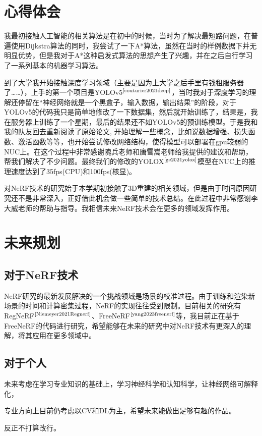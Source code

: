 \documentclass[UTF8,titlepage]{article}
\newcommand{\upcite}[1]{$^{\mbox{\scriptsize \cite{#1}}}$}
\numberwithin{figure}{section}
\begin{document}
\section{心得体会}

我最初接触人工智能的相关算法是在初中的时候，当时为了解决最短路问题，在普遍使用Dijkstra算法的同时，我尝试了一下A*算法，虽然在当时的样例数据下并无明显优势，但是我对于A*这种启发式算法的思想产生了兴趣，并在之后自行学习了一系列基本的机器学习算法。

到了大学我开始接触深度学习领域（主要是因为上大学之后手里有钱租服务器了……），上手的第一个项目是YOLOv5\upcite{couturier2021deep}，当时我对于深度学习的理解还停留在“神经网络就是一个黑盒子，输入数据，输出结果”的阶段，对于YOLOv5的代码我只是简单地修改了一下数据集，然后就开始训练了，结果是，我在服务器上训练了一个星期，最后的结果还不如YOLOv5的预训练模型。于是我和我的队友回去重新阅读了原始论文\cite{couturier2021deep}, 开始理解一些概念，比如说数据增强、损失函数、激活函数等等，也开始尝试修改网络结构，使得模型可以部署在gpu较弱的NUC上。在这个过程中非常感谢隗兵老师和唐雪嵩老师给我提供的建议和帮助，帮我们解决了不少问题。最终我们的修改的YOLOX\upcite{ge2021yolox}模型在NUC上的推理速度达到了35fps(CPU)和100fps(核显)。

对NeRF技术的研究始于本学期初接触了3D重建的相关领域，但是由于时间原因研究还不是非常深入，正好借此机会做一些简单的技术总结。在此过程中非常感谢李大威老师的帮助与指导。我相信未来NeRF技术会在更多的领域发挥作用。

\section{未来规划}
\subsection{对于NeRF技术}

NeRF研究的最新发展解决的一个挑战领域是场景的校准过程。由于训练和渲染新场景的时间和计算密集过程，NeRF的实现往往受到限制。目前相关的研究有RegNeRF\upcite{Niemeyer2021Regnerf}、FreeNeRF\upcite{yang2023freenerf}等，我目前正在基于FreeNeRF的代码进行研究，希望能够在未来的研究中对NeRF技术有更深入的理解，将其应用在更多领域中。

\subsection{对于个人}

未来考虑在学习专业知识的基础上，学习神经科学和认知科学，让神经网络可解释化，

专业方向上目前仍考虑以CV和DL为主，希望未来能做出足够有趣的作品。

反正不打算改行。
\clearpage


\vspace{12pt}
\end{document}
